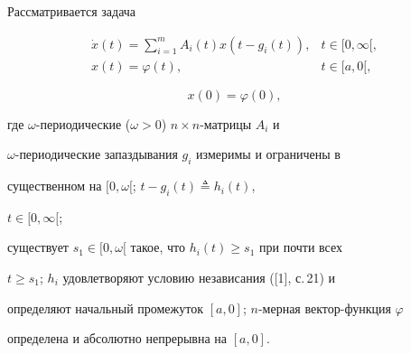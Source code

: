 \date{}




\pagestyle{plain} %







\maketitle


\label{begin}








Рассматривается задача


\begin{equation}


\begin{array}{ll}


\Dot x(t)=\sum\limits_{i=1}^m A_i(t)x(t-g_i(t)), & t\in[0,\infty[,\\


x(t)= \varphi(t), & t\in [a,0[,


\end{array}


\end{equation}


\begin{equation}


x(0)=\varphi(0),


\end{equation}


где $\omega$-периодические ($\omega>0$) $n\times n$-матрицы $A_i$ и


$\omega$-периодические  запаздывания $g_i$ измеримы и  ограничены в


существенном на $[0,\omega[$; $t-g_i(t)\triangleq h_i(t)$,


$t\in [0,\infty[$;


существует  $s_1\in [0,\omega[$ такое, что $h_i(t)\ge s_1$ при почти всех


$t\ge s_1$; $h_i$ удовлетворяют условию независания ([1], с.\,21) и


определяют начальный промежуток $[a,0]$; $n$-мерная вектор-функция $\varphi$


определена  и абсолютно непрерывна на $[a,0]$.





